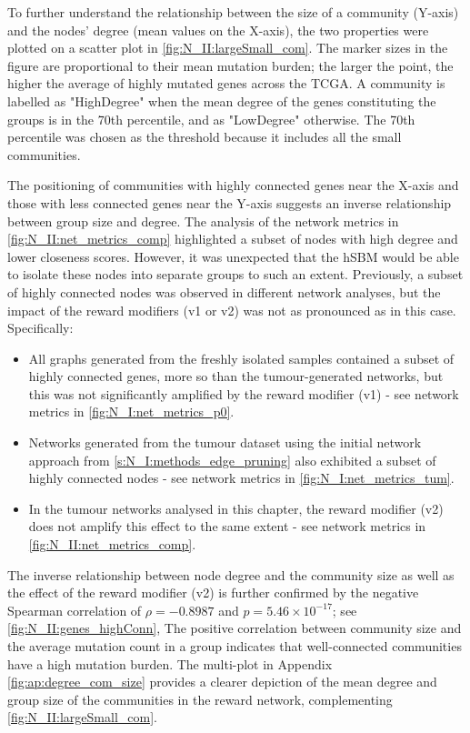 To further understand the relationship between the size of a community (Y-axis) and the nodes' degree (mean values on the X-axis), the two properties were plotted on a scatter plot in \cref{fig:N_II:largeSmall_com}. The marker sizes in the figure are proportional to their mean mutation burden; the larger the point, the higher the average of highly mutated genes across the TCGA. A community is labelled as "HighDegree" when the mean degree of the genes constituting the groups is in the 70th percentile, and as "LowDegree" otherwise. The 70th percentile was chosen as the threshold because it includes all the small communities.



The positioning of communities with highly connected genes near the X-axis and those with less connected genes near the Y-axis suggests an inverse relationship between group size and degree. The analysis of the network metrics in \cref{fig:N_II:net_metrics_comp} highlighted a subset of nodes with high degree and lower closeness scores. However, it was unexpected that the hSBM would be able to isolate these nodes into separate groups to such an extent. Previously, a subset of highly connected nodes was observed in different network analyses, but the impact of the reward modifiers (v1 or v2) was not as pronounced as in this case. Specifically:
\begin{itemize}
    \item All graphs generated from the freshly isolated samples contained a subset of highly connected genes, more so than the tumour-generated networks, but this was not significantly amplified by the reward modifier (v1) - see network metrics in \cref{fig:N_I:net_metrics_p0}.
    \item Networks generated from the tumour dataset using the initial network approach from \cref{s:N_I:methods_edge_pruning} also exhibited a subset of highly connected nodes - see network metrics in \cref{fig:N_I:net_metrics_tum}.
    \item In the tumour networks analysed in this chapter, the reward modifier (v2) does not amplify this effect to the same extent - see network metrics in \cref{fig:N_II:net_metrics_comp}.
\end{itemize}

The inverse relationship between node degree and the community size as well as the effect of the reward modifier (v2)  is further confirmed by the negative Spearman correlation of $\rho = -0.8987$ and $p = 5.46 \times 10^{-17}$; see \cref{fig:N_II:genes_highConn}, The positive correlation between community size and the average mutation count in a group indicates that well-connected communities have a high mutation burden. The multi-plot in Appendix \cref{fig:ap:degree_com_size} provides a clearer depiction of the mean degree and group size of the communities in the reward network, complementing \cref{fig:N_II:largeSmall_com}.

